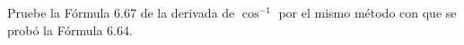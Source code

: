 \item Pruebe la Fórmula 6.67 de la derivada de $\cos^{-1}$ por el mismo método con que se probó la Fórmula 6.64.
